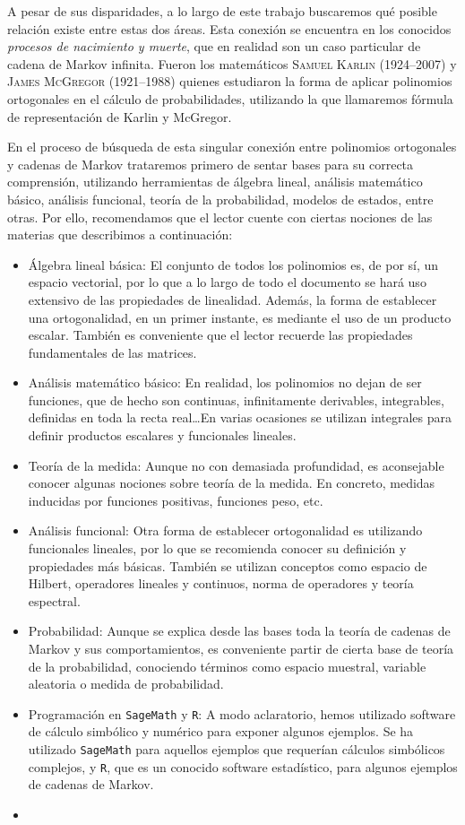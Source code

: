 A pesar de sus disparidades, a lo largo de este trabajo buscaremos qué posible relación existe entre estas dos áreas. Esta conexión se encuentra en los conocidos \textit{procesos de nacimiento y muerte}, que en realidad son un caso particular de cadena de Markov infinita. Fueron los matemáticos \textsc{Samuel Karlin} (1924--2007) y \textsc{James McGregor} (1921--1988) quienes estudiaron la forma de aplicar polinomios ortogonales en el cálculo de probabilidades, utilizando la que llamaremos fórmula de representación de Karlin y McGregor.

En el proceso de búsqueda de esta singular conexión entre polinomios ortogonales y cadenas de Markov trataremos primero de sentar bases para su correcta comprensión, utilizando herramientas de álgebra lineal, análisis matemático básico, análisis funcional, teoría de la probabilidad, modelos de estados, entre otras. Por ello, recomendamos que el lector cuente con ciertas nociones de las materias que describimos a continuación:
\begin{itemize}
    \item Álgebra lineal básica: El conjunto de todos los polinomios es, de por sí, un espacio vectorial, por lo que a lo largo de todo el documento se hará uso extensivo de las propiedades de linealidad. Además, la forma de establecer una ortogonalidad, en un primer instante, es mediante el uso de un producto escalar. También es conveniente que el lector recuerde las propiedades fundamentales de las matrices.
    \item Análisis matemático básico: En realidad, los polinomios no dejan de ser funciones, que de hecho son continuas, infinitamente derivables, integrables, definidas en toda la recta real\dots En varias ocasiones se utilizan integrales para definir productos escalares y funcionales lineales.
    \item Teoría de la medida: Aunque no con demasiada profundidad, es aconsejable conocer algunas nociones sobre teoría de la medida. En concreto, medidas inducidas por funciones positivas, funciones peso, etc.
    \item Análisis funcional: Otra forma de establecer ortogonalidad es utilizando funcionales lineales, por lo que se recomienda conocer su definición y propiedades más básicas. También se utilizan conceptos como espacio de Hilbert, operadores lineales y continuos, norma de operadores y teoría espectral.
    \item Probabilidad: Aunque se explica desde las bases toda la teoría de cadenas de Markov y sus comportamientos, es conveniente partir de cierta base de teoría de la probabilidad, conociendo términos como espacio muestral, variable aleatoria o medida de probabilidad.
    \item Programación en \texttt{SageMath} y \texttt{R}: A modo aclaratorio, hemos utilizado software de cálculo simbólico y numérico para exponer algunos ejemplos. Se ha utilizado \texttt{SageMath} para aquellos ejemplos que requerían cálculos simbólicos complejos, y \texttt{R}, que es un conocido software estadístico, para algunos ejemplos de cadenas de Markov.
    \item {}
\end{itemize}


